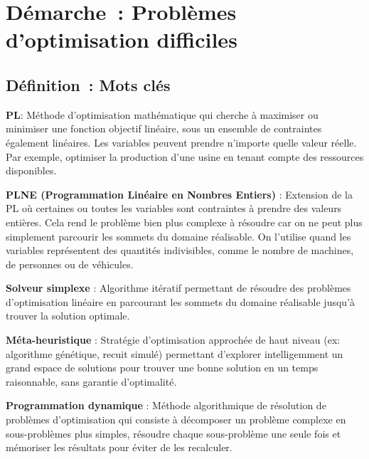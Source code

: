 \newpage
\section*{Démarche~: Problèmes d'optimisation difficiles}

\subsection*{Définition~: Mots clés}
{}

\noindent \textbf{PL}: Méthode d'optimisation mathématique qui cherche à maximiser ou minimiser une fonction objectif linéaire, sous un ensemble de contraintes également linéaires. Les variables peuvent prendre n'importe quelle valeur réelle. Par exemple, optimiser la production d'une usine en tenant compte des ressources disponibles.

\vspace{0.5cm}

\noindent \textbf{PLNE (Programmation Linéaire en Nombres Entiers)} : Extension de la PL où certaines ou toutes les variables sont contraintes à prendre des valeurs entières. Cela rend le problème bien plus complexe à résoudre car on ne peut plus simplement parcourir les sommets du domaine réalisable. On l'utilise quand les variables représentent des quantités indivisibles, comme le nombre de machines, de personnes ou de véhicules.

\vspace{0.5cm}

\noindent \textbf{Solveur simplexe} : Algorithme itératif permettant de résoudre des problèmes d'optimisation linéaire en parcourant les sommets du domaine réalisable jusqu'à trouver la solution optimale.

\vspace{0.5cm}

\noindent \textbf{Méta-heuristique} : Stratégie d'optimisation approchée de haut niveau (ex: algorithme génétique, recuit simulé) permettant d'explorer intelligemment un grand espace de solutions pour trouver une bonne solution en un temps raisonnable, sans garantie d'optimalité.

\vspace{0.5cm}

\noindent \textbf{Programmation dynamique} : Méthode algorithmique de résolution de problèmes d'optimisation qui consiste à décomposer un problème complexe en sous-problèmes plus simples, résoudre chaque sous-problème une seule fois et mémoriser les résultats pour éviter de les recalculer.

